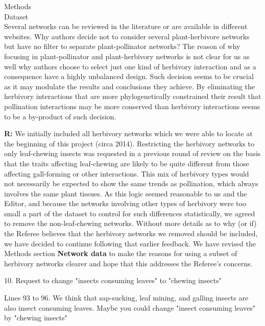 \documentclass[12pt]{letter}
\newenvironment{refquote}{\bigskip \begin{it}}{\end{it}\smallskip}
\begin{document}
		\begin{refquote}
		Methods\\
		Dataset\\
		Several networks can be reviewed in the literature or are available in different websites. Why authors decide not to consider several plant-herbivore networks but have no filter to separate plant-pollinator networks? The reason of why focusing in plant-pollinator and plant-herbivory networks is not clear for us as well why authors choose to select just one kind of herbivory interaction and as a consequence have a highly unbalanced design. Such decision seems to be crucial as it may modulate the results and conclusions they achieve. By eliminating the herbivory interactions that are more phylogenetically constrained their result that pollination interactions may be more conserved than herbivory interactions seems to be a by-product of such decision.
		\end{refquote}


		\textbf{R:} We initially included all herbivory networks which we were able to locate at the beginning of this project (circa 2014). Restricting the herbivory networks to only leaf-chewing insects was requested in a previous round of review on the basis that the traits affecting leaf-chewing are likely to be quite different from those affecting gall-forming or other interactions. This mix of herbivory types would not necessarily be expected to show the same trends as pollination, which always involves the same plant tissues. As this logic seemed reasonable to us and the Editor, and because the networks involving other types of herbivory were too small a part of the dataset to control for such differences statistically, we agreed to remove the non-leaf-chewing networks. Without more details as to why (or if) the Referee believes that the herbivory networks we removed should be included, we have decided to continue following that earlier feedback. We have revised the Methods section \textbf{Network data} to make the reasons for using a subset of herbivory networks clearer and hope that this addresses the Referee's concerns.


	10. Request to change "insects consuming leaves" to "chewing insects"

		\begin{refquote}
			Lines 93 to 96. We think that sap-sucking, leaf mining, and galling insects are also insect consuming leaves. Maybe you could change "insect consuming leaves" by "chewing insects"
		\end{refquote}
\end{document}

